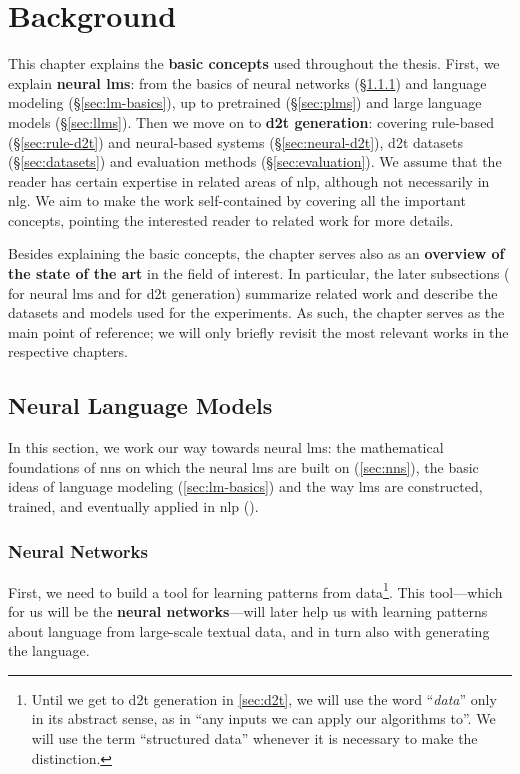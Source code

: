 
\chapter{Background}
\label{chap:background}

This chapter explains the \textbf{basic concepts} used throughout the thesis. First, we explain \textbf{neural \acp{lm}}: from the basics of neural networks (§\ref{sec:nns}) and language modeling (§\ref{sec:lm-basics}), up to pretrained (§\ref{sec:plms}) and large language models (§\ref{sec:llms}). Then we move on to \textbf{\ac{d2t} generation}: covering rule-based (§\ref{sec:rule-d2t}) and neural-based systems (§\ref{sec:neural-d2t}), \ac{d2t} datasets (§\ref{sec:datasets}) and evaluation methods (§\ref{sec:evaluation}). We assume that the reader has certain expertise in related areas of \ac{nlp}, although not necessarily in \ac{nlg}. We aim to make the work self-contained by covering all the important concepts, pointing the interested reader to related work for more details.

Besides explaining the basic concepts, the chapter serves also as an \textbf{overview of the state of the art} in the field of interest. In particular, the later subsections ( for neural \acp{lm} and  for \ac{d2t} generation) summarize related work and describe the datasets and models used for the experiments. As such, the chapter serves as the main point of reference; we will only briefly revisit the most relevant works in the respective chapters.


\section{Neural Language Models}
\label{sec:lms}
In this section, we work our way towards neural \acp{lm}: the mathematical foundations of \acp{nn} on which the neural \acp{lm} are built on (\autoref{sec:nns}), the basic ideas of language modeling (\autoref{sec:lm-basics}) and the way \acp{lm} are constructed, trained, and eventually applied in \ac{nlp} ().

\subsection{Neural Networks}
\label{sec:nns}
First, we need to build a tool for learning patterns from data\footnote{Until we get to \ac{d2t} generation in \autoref{sec:d2t}, we will use the word ``\textit{data}'' only in its abstract sense, as in ``any inputs we can apply our algorithms to''. We will use the term ``structured data'' whenever it is necessary to make the distinction.}. This tool---which for us will be the \textbf{neural networks}---will later help us with learning patterns about language from large-scale textual data, and in turn also with generating the language.

